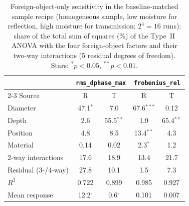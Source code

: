 \begin{table}[t]
\centering
\caption{Foreign-object-only sensitivity in the baseline-matched sample recipe (homogeneous sample, low moisture for reflection, high moisture for transmission; $2^{4}=16$ runs): share of the total sum of squares (\%) of the Type~II ANOVA with the four foreign-object factors and their two-way interactions (5 residual degrees of freedom). Stars: $^{*}p<0.05$, $^{**}p<0.01$.}
\label{tab:fo_only}
\begin{tabular}{lcccc}
\hline
 & \multicolumn{2}{c}{\texttt{rms\_dphase\_max}} & \multicolumn{2}{c}{\texttt{frobenius\_rel}}\\
\cline{2-3}\cline{4-5}
Source & R & T & R & T\\
\hline
Diameter & 47.1$^{*}$ & 7.0 & 67.6$^{***}$ & 0.12\\
Depth & 2.6 & 55.5$^{**}$ & 1.9 & 65.4$^{**}$\\
Position & 4.8 & 8.5 & 13.4$^{**}$ & 4.3\\
Material & 0.14 & 0.02 & 2.3$^{*}$ & 1.2\\
2-way interactions & 17.6 & 18.9 & 13.4 & 21.7\\
Residual (3-/4-way) & 27.8 & 10.1 & 1.5 & 7.3\\
\hline
$R^2$ & 0.722 & 0.899 & 0.985 & 0.927\\
Mean response & 12.2$^\circ$ & 0.6$^\circ$ & 0.101 & 0.007\\
\hline
\end{tabular}
\end{table}
